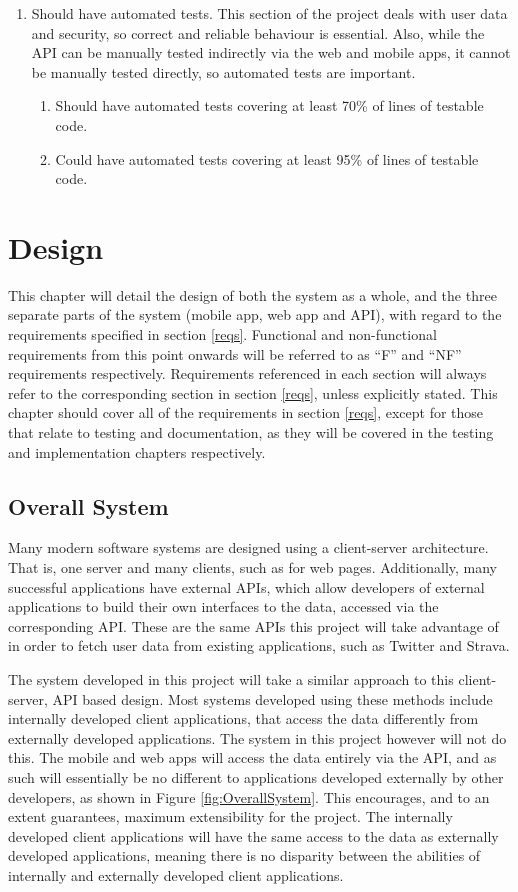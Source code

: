 \documentclass[11pt,openright,a4paper]{report}
\begin{document}
\begin{enumerate}
\item Should have automated tests. This section of the project deals with user data and security, so correct and reliable behaviour is essential. Also, while the API can be manually tested indirectly via the web and mobile apps, it cannot be manually tested directly, so automated tests are important.
  \begin{enumerate}
  \item Should have automated tests covering at least 70\% of lines of testable code.
  \item Could have automated tests covering at least 95\% of lines of testable code.
  \end{enumerate}
\end{enumerate}

\chapter{Design} \label{chap:design}
This chapter will detail the design of both the system as a whole, and the three separate parts of the system (mobile app, web app and API), with regard to the requirements specified in section \ref{reqs}. Functional and non-functional requirements from this point onwards will be referred to as \enquote{F} and \enquote{NF} requirements respectively. Requirements referenced in each section will always refer to the corresponding section in section \ref{reqs}, unless explicitly stated. This chapter should cover all of the requirements in section \ref{reqs}, except for those that relate to testing and documentation, as they will be covered in the testing and implementation chapters respectively.

\section{Overall System}
Many modern software systems are designed using a client-server architecture. That is, one server and many clients, such as for web pages. Additionally, many successful applications have external APIs, which allow developers of external applications to build their own interfaces to the data, accessed via the corresponding API. These are the same APIs this project will take advantage of in order to fetch user data from existing applications, such as Twitter and Strava.

The system developed in this project will take a similar approach to this client-server, API based design. Most systems developed using these methods include internally developed client applications, that access the data differently from externally developed applications. The system in this project however will not do this. The mobile and web apps will access the data entirely via the API, and as such will essentially be no different to applications developed externally by other developers, as shown in Figure \ref{fig:OverallSystem}. This encourages, and to an extent guarantees, maximum extensibility for the project. The internally developed client applications will have the same access to the data as externally developed applications, meaning there is no disparity between the abilities of internally and externally developed client applications.
\end{document}
